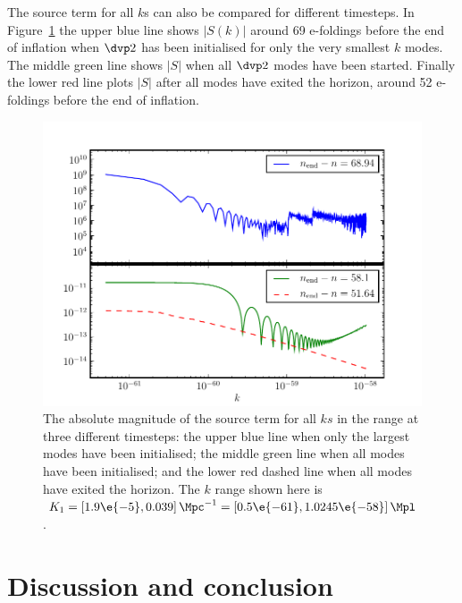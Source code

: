 The source term for all $k$s can also be compared for different timesteps. In
Figure~\ref{fig:src-3ns} the upper blue line shows $|S(k)|$ around 69 e-foldings
before the end of
inflation when $\dvp2$ has been initialised for only the very smallest $k$
modes. The middle green
line shows $|S|$ when all $\dvp2$ modes have been started. Finally the lower red
line plots $|S|$
after all modes have exited the horizon, around 52 e-foldings before the end of
inflation.
\begin{figure}
\includegraphics[scale=0.8]{numerical/graphs/src_3ns}
\caption{The absolute magnitude of the source term for all $ks$ in the range at
three different
timesteps: the upper blue line when only the largest modes have been
initialised; the middle green
line when all modes have been initialised; and the lower red dashed line when
all modes have
exited the horizon. The $k$ range shown here is $K_1=\left[ 1.9\e{-5}, 0.039
\right] \Mpc^{-1}= 
 \left[0.5\e{-61}, 1.0245\e{-58}\right]\Mpl$.}
\label{fig:src-3ns}
\end{figure}
% 

% 
% 
% 
\section{Discussion and conclusion}
\label{sec:disc-num}

